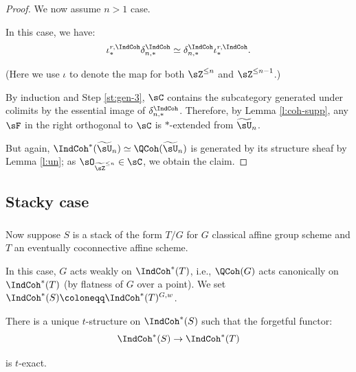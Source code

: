 \begin{proof}
\step

We now assume $n>1$ case.

In this case, we have:
%
\[
\iota_*^{r,\IndCoh}\delta_{n,*}^{\IndCoh} \simeq
\delta_{n,*}^{\IndCoh}
\iota_*^{r,\IndCoh}.
\]

 (Here we use $\iota$ to denote the map for both $\sZ^{\leq n}$
and $\sZ^{\leq n-1}$.)

By induction and Step \ref{st:gen-3}, $\sC$ contains the subcategory
generated under colimits by the essential image of
$\delta_{n,*}^{\IndCoh}$. Therefore, by Lemma \ref{l:coh-supp},
any $\sF$ in the right orthogonal to $\sC$ is $*$-extended
from $\widetilde{\sU}_n$.

But again, $\IndCoh^*(\widetilde{\sU}_n) \simeq \QCoh(\widetilde{\sU}_n)$ is generated
by its structure sheaf by Lemma \ref{l:un}; as
$\sO_{\widetilde{\sZ}^{\leq n}} \in \sC$, we obtain the claim.

\end{proof}


\subsection{Stacky case}

\subsubsection{}

Now suppose $S$ is a stack of the form $T/G$ for $G$ classical affine group scheme
and $T$ an eventually coconnective affine scheme.

In this case, $G$ acts weakly on $\IndCoh^*(T)$, i.e., $\QCoh(G)$
acts canonically on $\IndCoh^*(T)$ (by flatness of $G$ over a point).
We set $\IndCoh^*(S) \coloneqq \IndCoh^*(T)^{G,w}$.


There is a unique $t$-structure on $\IndCoh^*(S)$ such that the
forgetful functor:
%
\[
\IndCoh^*(S) \to \IndCoh^*(T)
\]

 is $t$-exact.


